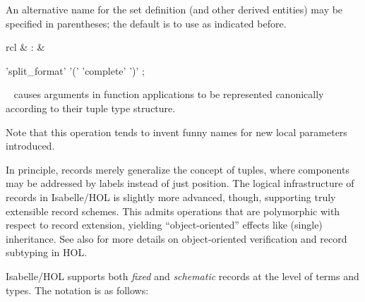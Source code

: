 \begin{isabellebody}
\begin{isamarkuptext}
\begin{description}
  An alternative name for the set definition (and other derived
  entities) may be specified in parentheses; the default is to use
   as indicated before.

  \end{description}%
\end{isamarkuptext}%
\isamarkuptrue%
%
\isamarkuptrue%
%
\begin{isamarkuptext}%
\begin{matharray}{rcl}
    \hyperlink{attribute.HOL.split-format}{\mbox{}} & : &  \\
  \end{matharray}

  \begin{rail}
    'split_format' '(' 'complete' ')'
    ;
  \end{rail}

  \begin{description}

  \item \hyperlink{attribute.HOL.split-format}{\mbox{}}\  causes
  arguments in function applications to be represented canonically
  according to their tuple type structure.

  Note that this operation tends to invent funny names for new local
  parameters introduced.

  \end{description}%
\end{isamarkuptext}%
\isamarkuptrue%
%
\isamarkuptrue%
%
\begin{isamarkuptext}%
In principle, records merely generalize the concept of tuples, where
  components may be addressed by labels instead of just position.  The
  logical infrastructure of records in Isabelle/HOL is slightly more
  advanced, though, supporting truly extensible record schemes.  This
  admits operations that are polymorphic with respect to record
  extension, yielding ``object-oriented'' effects like (single)
  inheritance.  See also \cite{NaraschewskiW-TPHOLs98} for more
  details on object-oriented verification and record subtyping in HOL.%
\end{isamarkuptext}%
\isamarkuptrue%
%
\isamarkuptrue%
%
\begin{isamarkuptext}%
Isabelle/HOL supports both \emph{fixed} and \emph{schematic} records
  at the level of terms and types.  The notation is as follows:


\end{isamarkuptext}
\end{isabellebody}
